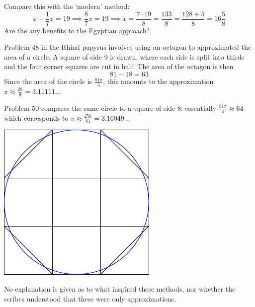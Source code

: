 Compare this with the `modern' method:
\[
	x+\frac 17x=19\implies \frac 87x=19\implies x=\frac{7\cdot 19}8 =\frac{133}8 =\frac{128+5}8= 16\frac 58
\]
Are the any benefits to the Egyptian approach?

\begin{minipage}[t]{0.67\linewidth}\vspace{0pt}
	
	Problem 48 in the Rhind papyrus involves using an octagon to approximated the area of a circle. A square of side 9 is drawn, where each side is split into thirds and the four corner squares are cut in half. The area of the octagon is then \[81-18=63\]
	Since the area of the circle is $\frac{81\pi}4$, this amounts to the approximation $\pi\approx\frac{28}9=3.11111\ldots$\smallbreak
	
	Problem 50 compares the same circle to a square of side 8: essentially $\frac{81\pi}4\approx 64$ which corresponds to $\pi\approx \frac{256}{81}=3.16049\ldots$
\end{minipage}
\hfill
\begin{minipage}[t]{0.32\linewidth}\vspace{0pt}
	\flushright\includegraphics{egypt-octagon}
\end{minipage}\medbreak


No explanation is given as to what inspired these methods, nor whether the scribes understood that these were only approximations.

\goodbreak

